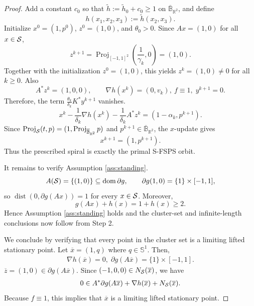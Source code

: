 \documentclass[11pt]{article}
\numberwithin{equation}{section}
\newcommand{\R}{\mathbb{R}}
\newcommand{\Lip}{\operatorname{Lip}}
\newcommand{\Sph}{\mathbb S}
\newcommand{\Sone}{\mathbb S^1}
\newcommand{\dist}{\operatorname{dist}}
\newcommand{\Proj}{\operatorname{Proj}}
\DeclareMathOperator{\dom}{dom}
\begin{document}
\begin{proof}
Add a constant $c_0$ so that $\widetilde h:=\widetilde h_0+c_0\ge1$ on $\overline{\mathbb B}_{\R^2}$, and define
\[
h(x_1,x_2,x_3):=\widetilde h(x_2,x_3).
\]
Initialize $x^0=(1,p^0)$, $z^0=(1,0)$, and $\theta_0>0$. Since $Ax=(1,0)$ for all $x\in\cal S$,
\[
z^{k+1}=\Proj_{[-1,1]^2}\left(\frac1{\gamma_k},0\right)=(1,0).
\]
Together with the initialization $z^0=(1,0)$, this yields  $z^k=(1,0)\neq0$ for all $k\ge0$. Also
\[
A^*z^k=(1,0,0),\qquad \nabla h(x^k)=(0,v_k),\ f\equiv 1,\; y^{k+1}=0.
\]
Therefore, the term  $\frac{\theta_k}{\delta_k}K^* y^{k+1}$ vanishes.
\[
x^k-\frac1{\delta_k}\nabla h(x^k)-\frac1{\delta_k}A^*z^k=(1-\alpha_k,p^{k+1}).
\]
Since $\Proj_{\cal S}(t,p)=(1,\Proj_{\overline{\mathbb B}_{\R^2}}p)$ and $p^{k+1}\in \overline{\mathbb B}_{\R^2}$, the $x$-update gives
\[
x^{k+1}=(1,p^{k+1}).
\]
Thus the prescribed spiral is exactly the primal S-FSPS orbit.

It remains to  verify Assumption \ref{ass:standing}.
\[
A({\cal S})=\{(1,0)\}\subseteq\dom\partial g,\qquad \partial g(1,0)=\{ 1 \}\times[-1,1],
\]
so $\dist(0,\partial g(Ax))=1$ for every $x\in{\cal S}$. Moreover,
\[
g(Ax)+h(x)=1+h(x)\ge2.
\]
Hence Assumption \ref{ass:standing} holds and the cluster-set and infinite-length conclusions now follow from Step 2.

We conclude by verifying that every point in the cluster set is a limiting lifted stationary point.
Let $\overline x=(1,q)$ where $q\in\Sone$. Then,
\begin{eqnarray}\nabla h(\overline x)=0,\;\partial g(A\overline x)=\{1\}\times [-1,1].\end{eqnarray}
$\overline z=(1,0)\in \partial g(A\overline x)$.
Since $(-1,0,0)\in N_{\cal S}(\overline x)$, we have
\begin{eqnarray*}0\in A^*\partial g(A{\overline x})+\nabla h(\overline x)+N_{\cal S}(\overline x).\end{eqnarray*}
Because $f\equiv 1$, this implies that $\overline x$ is  a limiting lifted stationary point.
\end{proof}
\end{document}
